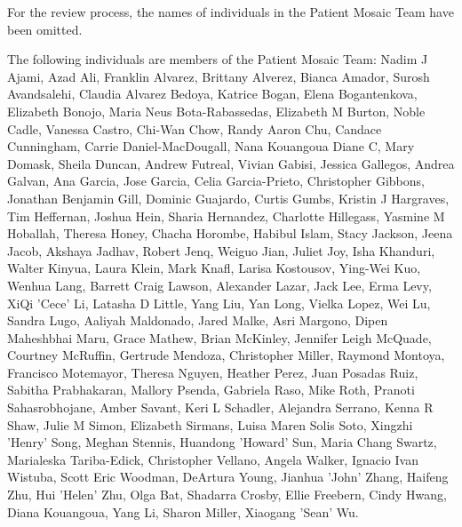 \documentclass{midl} %
\begin{document}
For the review process, the names of individuals in the Patient Mosaic Team have been omitted.

The following individuals are members of the Patient Mosaic Team: Nadim J Ajami, Azad Ali, Franklin Alvarez, Brittany Alverez, Bianca Amador, Surosh Avandsalehi, Claudia Alvarez Bedoya, Katrice Bogan, Elena Bogantenkova, Elizabeth Bonojo, Maria Neus Bota-Rabassedas, Elizabeth M Burton, Noble Cadle, Vanessa Castro, Chi-Wan Chow, Randy Aaron Chu, Candace Cunningham, Carrie Daniel-MacDougall, Nana Kouangoua Diane C, Mary Domask, Sheila Duncan, Andrew Futreal, Vivian Gabisi, Jessica Gallegos, Andrea Galvan, Ana Garcia, Jose Garcia, Celia Garcia-Prieto, Christopher Gibbons, Jonathan Benjamin Gill, Dominic Guajardo, Curtis Gumbs, Kristin J Hargraves, Tim Heffernan, Joshua Hein, Sharia Hernandez, Charlotte Hillegass, Yasmine M Hoballah, Theresa Honey, Chacha Horombe, Habibul Islam, Stacy Jackson, Jeena Jacob, Akshaya Jadhav, Robert Jenq, Weiguo Jian, Juliet Joy, Isha Khanduri, Walter Kinyua, Laura Klein, Mark Knafl, Larisa Kostousov, Ying-Wei Kuo, Wenhua Lang, Barrett Craig Lawson, Alexander Lazar, Jack Lee, Erma Levy, XiQi 'Cece' Li, Latasha D Little, Yang Liu, Yan Long, Vielka Lopez, Wei Lu, Sandra Lugo, Aaliyah Maldonado, Jared Malke, Asri Margono, Dipen Maheshbhai Maru, Grace Mathew, Brian McKinley, Jennifer Leigh McQuade, Courtney McRuffin, Gertrude Mendoza, Christopher Miller, Raymond Montoya, Francisco Motemayor, Theresa Nguyen, Heather Perez, Juan Posadas Ruiz, Sabitha Prabhakaran, Mallory Psenda, Gabriela Raso, Mike Roth, Pranoti Sahasrobhojane, Amber Savant, Keri L Schadler, Alejandra Serrano, Kenna R Shaw, Julie M Simon, Elizabeth Sirmans, Luisa Maren Solis Soto, Xingzhi 'Henry' Song, Meghan Stennis, Huandong 'Howard' Sun, Maria Chang Swartz, Marialeska Tariba-Edick, Christopher Vellano, Angela Walker, Ignacio Ivan Wistuba, Scott Eric Woodman, DeArtura Young, Jianhua 'John' Zhang, Haifeng Zhu, Hui 'Helen' Zhu, Olga Bat, Shadarra Crosby, Ellie Freebern, Cindy Hwang, Diana Kouangoua, Yang Li, Sharon Miller, Xiaogang 'Sean' Wu.
\end{document}
